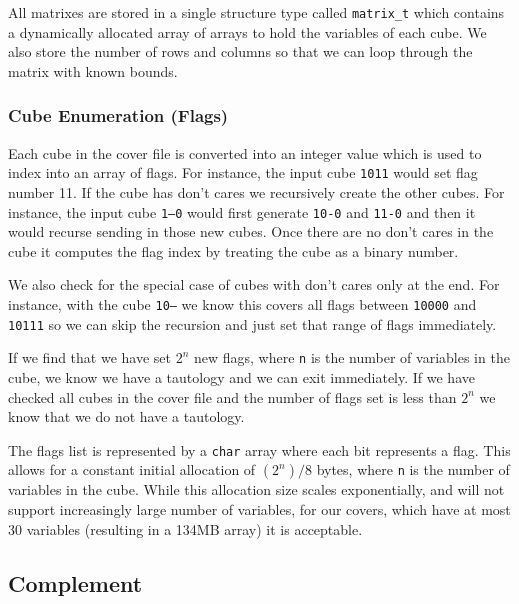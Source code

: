 \documentclass[10pt]{article}
\begin{document}
        All matrixes are stored in a single structure type called
        \texttt{matrix\_t} which contains a dynamically allocated array of
        arrays to hold the variables of each cube. We also store the number of
        rows and columns so that we can loop through the matrix with known
        bounds.

        \subsubsection{Cube Enumeration (Flags)}

        Each cube in the cover file is converted into an integer value which is
        used to index into an array of flags. For instance, the input cube
        \texttt{1011} would set flag number 11. If the cube has don't cares we
        recursively create the other cubes. For instance, the input cube
        \texttt{1--0} would first generate \texttt{10-0} and \texttt{11-0} and
        then it would recurse sending in those new cubes.  Once there are no
        don't cares in the cube it computes the flag index by treating the cube
        as a binary number.

        We also check for the special case of cubes with don't cares only at
        the end. For instance, with the cube \texttt{10---} we know this covers
        all flags between \texttt{10000} and \texttt{10111} so we can skip the
        recursion and just set that range of flags immediately.

        If we find that we have set $ 2^n $ new flags, where \texttt{n} is the
        number of variables in the cube, we know we have a tautology and we can
        exit immediately. If we have checked all cubes in the cover file and
        the number of flags set is less than $2^n$ we know that we do not have
        a tautology.

        The flags list is represented by a \texttt{char} array where each bit
        represents a flag. This allows for a constant initial allocation of
        $(2^n)/8$ bytes, where \texttt{n} is the number of variables in the
        cube. While this allocation size scales exponentially, and will not
        support increasingly large number of variables, for our covers, which
        have at most 30 variables (resulting in a 134MB array) it is
        acceptable.

    \subsection{Complement}
\end{document}

